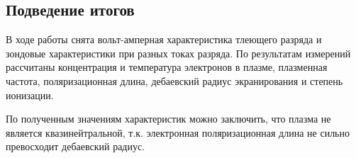 \documentclass[12pt,a4paper]{article}
\begin{document}
\begin{table}[H]
    \centering
    \caption{Вычисленные характеристики}
\end{table}

\subsection*{Подведение итогов}
В ходе работы снята вольт-амперная характеристика тлеющего разряда и зондовые характеристики при разных токах разряда.
По результатам измерений рассчитаны концентрация и температура электронов в плазме, плазменная частота, поляризационная длина, дебаевский радиус экранирования и степень ионизации.

По полученным значениям характеристик можно заключить, что плазма не является квазинейтральной, т.к. электронная поляризационная длина не сильно превосходит дебаевский радиус.
\end{document}
